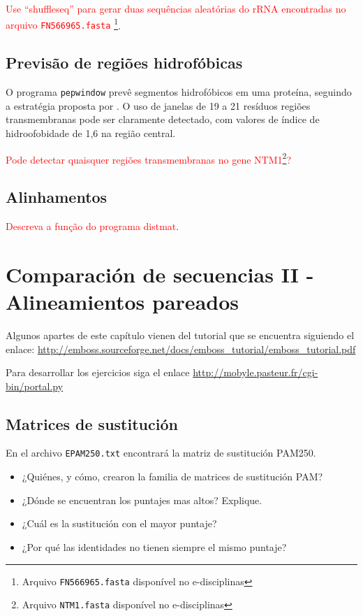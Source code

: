 \documentclass[letter,11pt]{book}
\begin{document}
\textcolor{red}{Use ``shuffleseq'' para gerar duas sequências aleatórias do rRNA encontradas no arquivo \Verb+FN566965.fasta+ \footnote{Arquivo \Verb+FN566965.fasta+ disponível no e-disciplinas}}.

\section{Previsão de regiões hidrofóbicas} O programa \Verb+pepwindow+ prevê segmentos hidrofóbicos em uma proteína, seguindo a estratégia proposta por \citep{Kyte1982}. O uso de janelas de 19 a 21 resíduos regiões transmembranas pode ser claramente detectado, com valores de índice de hidroofobidade de 1,6 na região central.

\textcolor{red}{Pode detectar quaisquer regiões transmembranas no gene NTM1\footnote{Arquivo \Verb+NTM1.fasta+ disponível no e-disciplinas}?}

\section{Alinhamentos}

\textcolor{red}{Descreva a função do programa distmat}.

\chapter{Comparación de secuencias II - Alineamientos pareados}

Algunos apartes de este capítulo vienen del tutorial que se encuentra siguiendo el enlace: \url{http://emboss.sourceforge.net/docs/emboss_tutorial/emboss_tutorial.pdf}

Para desarrollar los ejercicios siga el enlace \url{http://mobyle.pasteur.fr/cgi-bin/portal.py}

\section{Matrices de sustitución}

En el archivo \Verb+EPAM250.txt+ encontrará la matriz de sustitución PAM250.


{
\color{red}
\begin{itemize}
\item ¿Quiénes, y cómo, crearon la familia de matrices de sustitución PAM?
\item ¿Dónde se encuentran los puntajes mas altos? Explique.
\item ¿Cuál es la sustitución con el mayor puntaje?
\item ¿Por qué las identidades  no tienen siempre el mismo puntaje?
\end{itemize}

}
\end{document}
